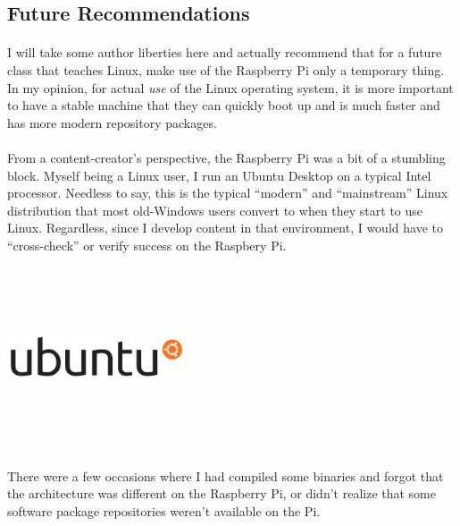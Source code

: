 \documentclass[11pt]{article}
\begin{document}
	\subsection{Future Recommendations}

	\paragraph{} I will take some author liberties here and actually recommend that for a future class that teaches Linux, make use of the Raspberry Pi only a temporary thing. In my opinion, for actual \textit{use} of the Linux operating system, it is more important to have a stable machine that they can quickly boot up and is much faster and has more modern repository packages. 

	\paragraph{} From a content-creator's perspective, the Raspberry Pi was a bit of a stumbling block. Myself being a Linux user, I run an Ubuntu Desktop on a typical Intel processor. Needless to say, this is the typical ``modern'' and ``mainstream'' Linux distribution that most old-Windows users convert to when they start to use Linux. Regardless, since I develop content in that environment, I would have to ``cross-check'' or verify success on the Raspbery Pi.  


	\begin{center}

		\graphicspath{ {.} }
		\includegraphics[width=200px,height=200px,keepaspectratio]{ubuntu_logo.png}
		\centering

	\end{center}

	\paragraph{} There were a few occasions where I had compiled some binaries and forgot that the architecture was different on the Raspberry Pi, or didn't realize that some software package repositories weren't available on the Pi.
\end{document}

